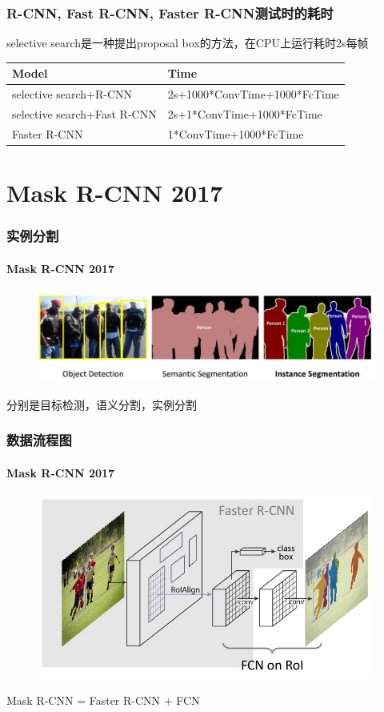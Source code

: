 \documentclass{beamer}
\begin{document}
    \begin{frame}
        \frametitle{R-CNN, Fast R-CNN, Faster R-CNN测试时的耗时}
        selective search是一种提出proposal box的方法，在CPU上运行耗时2s每帧
        \begin{table}  
            \centering  
            \begin{tabular}{|l|p{6cm}|}  
                  \hline Model & Time\\  
                  \hline selective search+R-CNN & 2s+1000*ConvTime+1000*FcTime \\
                  \hline selective search+Fast R-CNN & 2s+1*ConvTime+1000*FcTime  \\
                  \hline Faster R-CNN & 1*ConvTime+1000*FcTime \\
                  \hline
            \end{tabular}  
          \end{table}  
    \end{frame}


    \section{Mask R-CNN 2017}
    
    \begin{frame}
        \frametitle{实例分割}
        \framesubtitle{Mask R-CNN 2017}
        \begin{figure}
            \includegraphics[height=3cm]{../graphic/objseg.jpg}
        \end{figure}
        分别是目标检测，语义分割，实例分割
    \end{frame}

    \begin{frame}
        \frametitle{数据流程图}
        \framesubtitle{Mask R-CNN 2017}
        \begin{figure}
            \centering
            \includegraphics[height=6cm]{../graphic/maskrcnn.jpg}
        \end{figure}
        Mask R-CNN = Faster R-CNN + FCN
    \end{frame}
    
\end{document}
